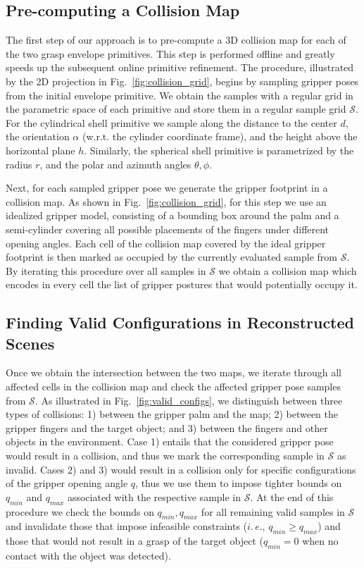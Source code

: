 \subsection{Pre-computing a Collision Map}
\label{sec:sampling}
%
The first step of our approach is to pre-compute a 3D collision map for each of the two grasp envelope primitives.
This step is performed offline and greatly speeds up the subsequent online primitive refinement.
The procedure, illustrated by the 2D projection in Fig.~\ref{fig:collision_grid}, begins by sampling gripper poses from the initial envelope primitive.
We obtain the samples with a regular grid in the parametric space of each primitive and store them in a regular sample grid $\mathcal{S}$.
For the cylindrical shell primitive we sample along the distance to the center $d$, the orientation $\alpha$ (w.r.t. the cylinder  coordinate frame), and the height above the horizontal plane $h$. 
Similarly, the spherical shell primitive is parametrized by the radius $r$, and the polar and azimuth angles $\theta,\phi$.
\par
Next, for each sampled gripper pose we generate the gripper footprint in a collision map. 
As shown in Fig.~\ref{fig:collision_grid}, for this step we use an idealized gripper model, consisting of a bounding box around the palm and a semi-cylinder covering all possible placements of the fingers under different opening angles.
Each cell of the collision map covered by the ideal gripper footprint is then marked as occupied by the currently evaluated sample from $\mathcal{S}$. 
By iterating this procedure over all samples in $\mathcal{S}$ we obtain a collision map which encodes in every cell the list of gripper postures that would potentially occupy it.
%
\subsection{Finding Valid Configurations in Reconstructed Scenes}
\label{sec:collision_check}
Once we obtain the intersection between the two maps, we iterate through all affected cells in the collision map and check the affected gripper pose samples from $\mathcal{S}$.
As illustrated in Fig.~\ref{fig:valid_configs}, we distinguish between three types of collisions: 1) between the gripper palm and the map; 2) between the gripper fingers and the target object; and 3) between the fingers and other objects in the environment. 
Case 1) entails that the considered gripper pose would result in a collision, and thus we mark the corresponding sample in $\mathcal{S}$ as invalid.
Cases 2) and 3) would result in a collision only for specific configurations of the gripper opening angle $q$, thus we use them to impose tighter bounds on $q_{min}$ and $q_{max}$ associated with the respective sample in $\mathcal{S}$. 
At the end of this procedure we check the bounds on $q_{min},q_{max}$ for all remaining valid samples in $\mathcal{S}$ and invalidate those that impose infeasible constraints ($i.\,e.$, $q_{min}\geq q_{max}$) and those that would not result in a grasp of the target object ($q_{min} = 0$ when no contact with the object was detected).

